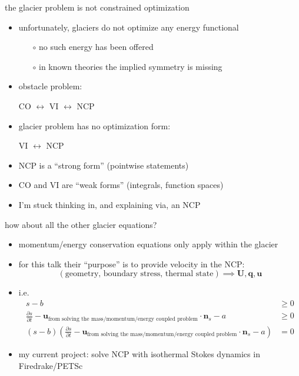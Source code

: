 \documentclass[10pt,hyperref,dvipsnames]{beamer}
\newcommand{\bn}{\mathbf{n}}
\newcommand{\bq}{\mathbf{q}}
\newcommand{\bu}{\mathbf{u}}
\newcommand{\bU}{\mathbf{U}}
\begin{document}
\begin{frame}{the glacier problem is not constrained optimization}

\begin{itemize}
\item unfortunately, glaciers do not optimize any energy functional
    \begin{itemize}
    \item[$\circ$] no such energy has been offered
    \item[$\circ$] in known theories the implied symmetry is missing
    \end{itemize}

\medskip
\item obstacle problem:

\medskip
\hspace{20mm} CO $\leftrightarrow$ VI $\leftrightarrow$ NCP

\smallskip
\item glacier problem has no optimization form:

\smallskip
\hspace{20mm} \phantom{CO $\leftrightarrow$} VI $\leftrightarrow$ NCP

\medskip
\item NCP is a ``strong form'' (pointwise statements)
\item CO and VI are ``weak forms'' (integrals, function spaces)

\medskip
\item I'm stuck thinking in, and explaining via, an NCP
\end{itemize}
\end{frame}


\begin{frame}{how about all the other glacier equations?}
\begin{itemize}
\item momentum/energy conservation equations only apply within the glacier
\item for this talk their ``purpose'' is to provide velocity in the NCP:
    $$(\text{geometry, boundary stress, thermal state}) \implies \bU,\bq,\bu$$
\item i.e.
\begin{align*}
s-b &\ge 0 \\
\frac{\partial s}{\partial t} - \bu_{\text{from solving the mass/momentum/energy coupled problem}} \cdot \bn_s - a &\ge 0 \\
(s-b) \left(\frac{\partial s}{\partial t} - \bu_{\text{from solving the mass/momentum/energy coupled problem}} \cdot \bn_s - a\right) &= 0
\end{align*}

\bigskip
\item my current project: solve NCP with isothermal Stokes dynamics in Firedrake/PETSc
\end{itemize}
\end{frame}
\end{document}
